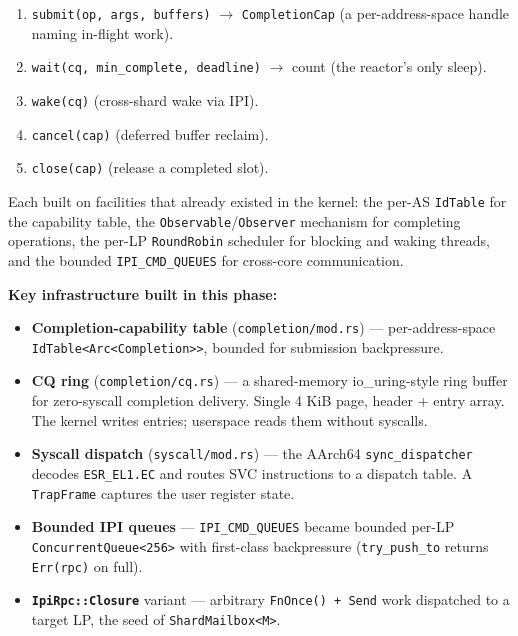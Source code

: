 \begin{enumerate}
    \item \texttt{submit(op, args, buffers)} $\rightarrow$ \texttt{CompletionCap}
        (a per-address-space handle naming in-flight work).
    \item \texttt{wait(cq, min\_complete, deadline)} $\rightarrow$ count (the
        reactor's only sleep).
    \item \texttt{wake(cq)} (cross-shard wake via IPI).
    \item \texttt{cancel(cap)} (deferred buffer reclaim).
    \item \texttt{close(cap)} (release a completed slot).
\end{enumerate}

Each built on facilities that already existed in the kernel: the per-AS
\texttt{IdTable} for the capability table, the \texttt{Observable}/\texttt{Observer}
mechanism for completing operations, the per-LP \texttt{RoundRobin} scheduler
for blocking and waking threads, and the bounded \texttt{IPI\_CMD\_QUEUES} for
cross-core communication.

\textbf{Key infrastructure built in this phase:}

\begin{itemize}
    \item \textbf{Completion-capability table} (\texttt{completion/mod.rs}) ---
        per-address-space \texttt{IdTable<Arc<Completion>>}, bounded for
        submission backpressure.
    \item \textbf{CQ ring} (\texttt{completion/cq.rs}) --- a shared-memory
        io\_uring-style ring buffer for zero-syscall completion delivery.
        Single 4 KiB page, header + entry array. The kernel writes entries;
        userspace reads them without syscalls.
    \item \textbf{Syscall dispatch} (\texttt{syscall/mod.rs}) --- the AArch64
        \texttt{sync\_dispatcher} decodes \texttt{ESR\_EL1.EC} and routes SVC
        instructions to a dispatch table. A \texttt{TrapFrame} captures the user
        register state.
    \item \textbf{Bounded IPI queues} --- \texttt{IPI\_CMD\_QUEUES} became
        bounded per-LP \texttt{ConcurrentQueue<256>} with first-class
        backpressure (\texttt{try\_push\_to} returns \texttt{Err(rpc)} on full).
    \item \textbf{\texttt{IpiRpc::Closure}} variant --- arbitrary
        \texttt{FnOnce() + Send} work dispatched to a target LP, the seed of
        \texttt{ShardMailbox<M>}.
\end{itemize}


